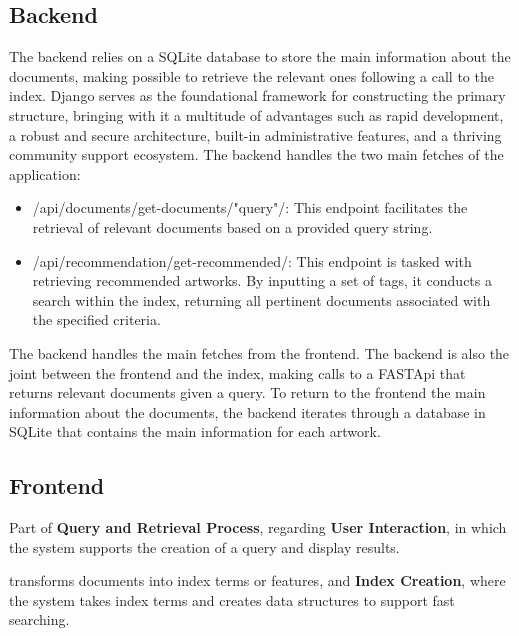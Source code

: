 \documentclass[12pt]{spieman}  %
\begin{document}
\begin{spacing}{1}
    \subsection{Backend}\label{sec:backend}
    The backend relies on a SQLite database to store the main information about the documents,
    making possible to retrieve the relevant ones following a call to the index.\newline
    Django serves as the foundational framework for constructing the primary structure,
    bringing with it a multitude of advantages such as rapid development, a robust and secure architecture,
    built-in administrative features, and a thriving community support ecosystem.\newline
    The backend handles the two main fetches of the application:
    \begin{itemize}
        \item /api/documents/get-documents/"query"/:
              This endpoint facilitates the retrieval of relevant documents based on a provided query string.
        \item /api/recommendation/get-recommended/:
              This endpoint is tasked with retrieving recommended artworks.
              By inputting a set of tags, it conducts a search within the index,
              returning all pertinent documents associated with the specified criteria.
    \end{itemize}
    The backend handles the main fetches from the frontend.
    The backend is also the joint between the frontend and the index,
    making calls to a FASTApi that returns relevant documents given a query.
    To return to the frontend the main information about the documents,
    the backend iterates through a database in SQLite that contains the main information
    for each artwork.

    \subsection{Frontend}\label{sec:frontend}
    Part of \textbf{Query and Retrieval Process}, regarding \textbf{User Interaction},
    in which the system supports the creation of a query and display results.

    transforms documents into index terms or features, and \textbf{Index Creation}, where the
    system takes index terms and creates data structures to support fast searching.


\end{spacing}
\end{document}
